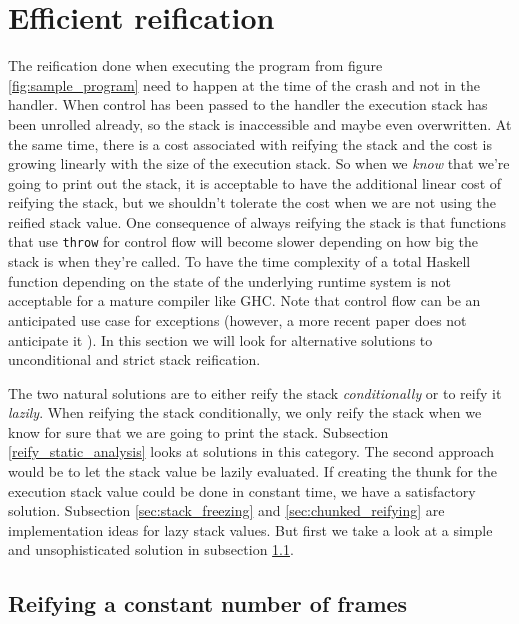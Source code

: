 \section{Efficient reification} \label{sec:lazy_reification}

The reification done when executing the program from figure
\ref{fig:sample_program} need to happen at the time of the crash and
not in the handler. When control has been passed to the handler the
execution stack has been unrolled already, so the stack is inaccessible
and maybe even overwritten. At the same time, there is a cost associated
with reifying the stack and the cost is growing linearly with the size
of the execution stack. So when we \emph{know} that we're going to print
out the stack, it is acceptable to have the additional linear cost of
reifying the stack, but we shouldn't tolerate the cost when we are not
using the reified stack value. One consequence of always reifying the
stack is that functions that use \texttt{throw} for control flow will
become slower depending on how big the stack is when they're called.
To have the time complexity of a total Haskell function depending on
the state of the underlying runtime system is not acceptable for a mature
compiler like GHC. Note that control flow can be an anticipated use case for
exceptions \cite{peyton1999semantics} (however, a more recent paper
does not anticipate it \cite{marlow2006extensible}).
In this section we will look for alternative solutions
to unconditional and strict stack reification.

The two natural solutions are to either reify the stack \emph{conditionally} or
to reify it \emph{lazily}. When reifying the stack conditionally, we only reify the stack
when we know for sure that we are going to print the stack. Subsection
\ref{reify_static_analysis} looks at solutions in this category.
The second approach would be to let the stack value be lazily evaluated. If creating the thunk for
the execution stack value could be done in constant time, we have a
satisfactory solution. Subsection \ref{sec:stack_freezing}
and \ref{sec:chunked_reifying} are implementation ideas for lazy stack values.
But first we take a look at a simple and
unsophisticated solution in subsection \ref{sec:constant_frames}.

\subsection{Reifying a constant number of frames} \label{sec:constant_frames}

